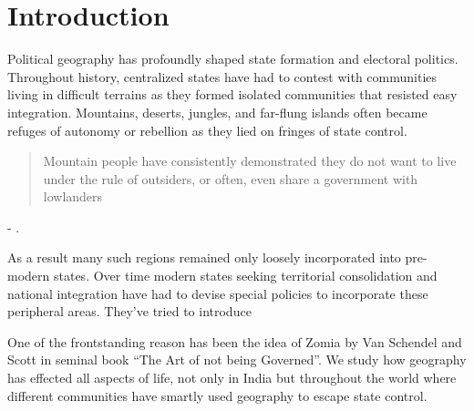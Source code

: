 \section{Introduction}
Political geography has profoundly shaped state formation and electoral politics. Throughout history, centralized states have had to contest with communities living in difficult terrains as they formed isolated communities that resisted easy integration. Mountains, deserts, jungles, and far-flung islands often became refuges of autonomy or rebellion as they lied on fringes of state control. \begin{quote} Mountain people have consistently demonstrated they do not want to live under the rule of outsiders, or often, even share a government with lowlanders\end{quote} 

\hspace*{\fill} - \cite{Hammes2017}. 

As a result many such regions remained only loosely incorporated into pre-modern states. Over time modern states seeking territorial consolidation and national integration have had to devise special policies to incorporate these peripheral areas. They've tried to introduce 

One of the frontstanding reason has been the idea of Zomia \citep{scott2005civilizations,van2005geographies} by Van Schendel and Scott in seminal book ``The Art of not being Governed''. We study how geography has effected all aspects of life, not only in India but throughout the world where different communities have smartly used geography to escape state control.